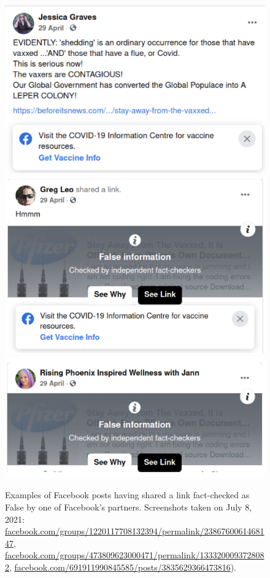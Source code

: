 \documentclass{article}
\begin{document}
\begin{figure}[h]
\centering
\includegraphics[scale=0.35]{./img/fb_flags/fb_flag_1.png}
\includegraphics[scale=0.35]{./img/fb_flags/fb_flag_2.png}
\includegraphics[scale=0.49]{./img/fb_flags/fb_flag_3.png}
\caption{Examples of Facebook posts having shared a link fact-checked as False by one of Facebook’s partners. Screenshots taken on July 8, 2021: \href{https://www.facebook.com/groups/1220117708132394/permalink/2386760061468147}{facebook.com/groups/1220117708132394/permalink/2386760061468147},  \href{https://www.facebook.com/groups/473809623000471/permalink/1333200093728082}{facebook.com/groups/473809623000471/permalink/1333200093728082}, \href{https://www.facebook.com/691911990845585/posts/3835629366473816}{facebook.com/691911990845585/posts/3835629366473816}).} 
\label{fb_flags}
\end{figure}
\end{document}

